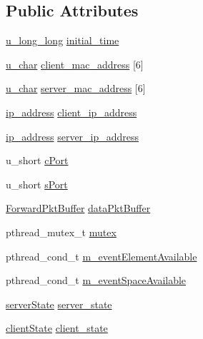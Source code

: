 \subsection*{\-Public \-Attributes}
\begin{DoxyCompactItemize}
\item 
\hyperlink{split__tcp__gateway_8h_ae16666ecf73bb70201bc64a6ccc329f1}{u\-\_\-long\-\_\-long} \hyperlink{structconn__state_a09d8624f696a5e87f7c4bd8258cdf650}{initial\-\_\-time}
\item 
\hyperlink{split__tcp__gateway_8h_ae2b02ed168fc99cff3851603910b1fb6}{u\-\_\-char} \hyperlink{structconn__state_a0a51afa30b43a49ec6edbe42c53e485b}{client\-\_\-mac\-\_\-address} \mbox{[}6\mbox{]}
\item 
\hyperlink{split__tcp__gateway_8h_ae2b02ed168fc99cff3851603910b1fb6}{u\-\_\-char} \hyperlink{structconn__state_a5062441e7d6f98886abb69ae31b4b995}{server\-\_\-mac\-\_\-address} \mbox{[}6\mbox{]}
\item 
\hyperlink{structip__address}{ip\-\_\-address} \hyperlink{structconn__state_a09bc5f34de7734aeaf0861201446117f}{client\-\_\-ip\-\_\-address}
\item 
\hyperlink{structip__address}{ip\-\_\-address} \hyperlink{structconn__state_a19c352b66ea5d4718375803b8e75f78f}{server\-\_\-ip\-\_\-address}
\item 
u\-\_\-short \hyperlink{structconn__state_a84fa2359c885ddd04fde1f9ff159237f}{c\-Port}
\item 
u\-\_\-short \hyperlink{structconn__state_ad3301160ee6f1d88ce6bb145c66c0b43}{s\-Port}
\item 
\hyperlink{structForwardPktBuffer}{\-Forward\-Pkt\-Buffer} \hyperlink{structconn__state_a23360dc0166aa34aae490ab47ee8ddc5}{data\-Pkt\-Buffer}
\item 
pthread\-\_\-mutex\-\_\-t \hyperlink{structconn__state_a66658e34b308e8c7e9197be0471e4046}{mutex}
\item 
pthread\-\_\-cond\-\_\-t \hyperlink{structconn__state_a6c1029b6951da7864f0ada1578fca82f}{m\-\_\-event\-Element\-Available}
\item 
pthread\-\_\-cond\-\_\-t \hyperlink{structconn__state_aa9f009393861dd5ad935e93de0d74b3e}{m\-\_\-event\-Space\-Available}
\item 
\hyperlink{structserverState}{server\-State} \hyperlink{structconn__state_a630485e95406127782b0c2865fef3a4f}{server\-\_\-state}
\item 
\hyperlink{structclientState}{client\-State} \hyperlink{structconn__state_af324b8f7643246725ce8e024b0c13eb9}{client\-\_\-state}

\end{DoxyCompactItemize}
